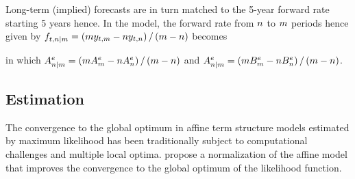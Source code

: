 {%
Long-term (implied) forecasts 
are in turn matched to the 5-year forward rate starting 5 years hence.
In the model, the forward rate from \(n\) to \(m\) periods hence
given by \(f_{t,n | m} = \left( m y_{t,m} - n y_{t,n} \right)/ \left( m - n \right)\) becomes

\noindent in which \(A_{n | m}^{e} = \left( m A_{m}^{e} - n A_{n}^{e} \right)/ \left( m - n \right)\)  and \(A_{n | m}^{e} = \left( m B_{m}^{e} - n B_{n}^{e} \right)/ \left( m - n \right)\).


%	
%	
%	


%


\subsection{Estimation} \label{sec:Estimation}
\iftoggle{toclinks}{\gototoc}{} %
The convergence to the global optimum in affine term structure models estimated by maximum likelihood has been traditionally subject to computational challenges and multiple local optima.
\cite{JSZ:2011} propose a normalization of the affine model that improves the convergence to the global optimum of the likelihood function.

}
